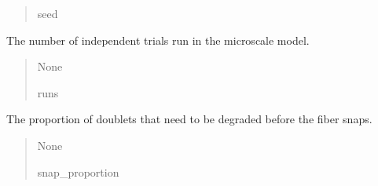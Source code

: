 \documentclass[letterpaper,10pt,english]{sphinxmanual}
\begin{document}
\begin{fulllineitems}
\begin{fulllineitems}
\begin{quote}
\begin{description}
\sphinxAtStartPar
seed

\end{description}\end{quote}

\end{fulllineitems}


\begin{fulllineitems}
\label{\detokenize{lysis.util:lysis.util.parameters.MicroParameters.simulations}}
\pysigstartsignatures
{}
\pysigstopsignatures
\sphinxAtStartPar
The number of independent trials run in the microscale model.
\begin{quote}\begin{description}
\sphinxAtStartPar
None

\sphinxAtStartPar
runs

\end{description}\end{quote}

\end{fulllineitems}


\begin{fulllineitems}
\label{\detokenize{lysis.util:lysis.util.parameters.MicroParameters.snap_proportion}}
\pysigstartsignatures
{}
\pysigstopsignatures
\sphinxAtStartPar
The proportion of doublets that need to be degraded before the
fiber snaps.
\begin{quote}\begin{description}
\sphinxAtStartPar
None

\sphinxAtStartPar
snap\_proportion

\end{description}\end{quote}


\end{fulllineitems}
\end{fulllineitems}
\end{document}

